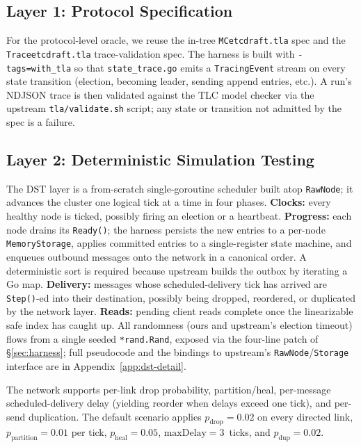 \documentclass{article}
\begin{document}
\subsection{Layer 1: Protocol Specification}
\label{sec:harness-tla}
For the protocol-level oracle, we reuse the in-tree
\texttt{MCetcdraft.tla} spec and the \texttt{Traceetcdraft.tla}
trace-validation spec. The harness is built with
\texttt{-tags=with\_tla} so that \texttt{state\_trace.go} emits a
\texttt{TracingEvent} stream on every state transition (election,
becoming leader, sending append entries, etc.). A run's NDJSON trace
is then validated against the TLC model checker via the upstream
\texttt{tla/validate.sh} script; any state or transition not
admitted by the spec is a failure.

\subsection{Layer 2: Deterministic Simulation Testing}
\label{sec:harness-dst}
The DST layer is a from-scratch single-goroutine scheduler built atop
\texttt{RawNode}; it advances the cluster one logical tick at a time
in four phases.
\textbf{Clocks:} every healthy node is ticked, possibly firing an
election or a heartbeat.
\textbf{Progress:} each node drains its \texttt{Ready()}; the
harness persists the new entries to a per-node \texttt{MemoryStorage},
applies committed entries to a single-register state machine, and
enqueues outbound messages onto the network in a canonical order.
A deterministic sort is required because upstream builds the outbox
by iterating a Go map.
\textbf{Delivery:} messages whose scheduled-delivery tick has arrived
are \texttt{Step()}-ed into their destination, possibly being
dropped, reordered, or duplicated by the network layer.
\textbf{Reads:} pending client reads complete once the linearizable
safe index has caught up.
All randomness (ours and upstream's election timeout) flows
from a single seeded \texttt{*rand.Rand}, exposed via the four-line
patch of \S\ref{sec:harness}; full pseudocode and the bindings to
upstream's \texttt{RawNode}/\texttt{Storage} interface are in
Appendix~\ref{app:dst-detail}.

The network supports per-link drop probability, partition/heal,
per-message scheduled-delivery delay (yielding reorder when delays
exceed one tick), and per-send duplication. The default scenario
applies $p_\text{drop}=0.02$ on every directed link,
$p_\text{partition}=0.01$ per tick, $p_\text{heal}=0.05$,
$\text{maxDelay}=3$~ticks, and $p_\text{dup}=0.02$.
\end{document}
